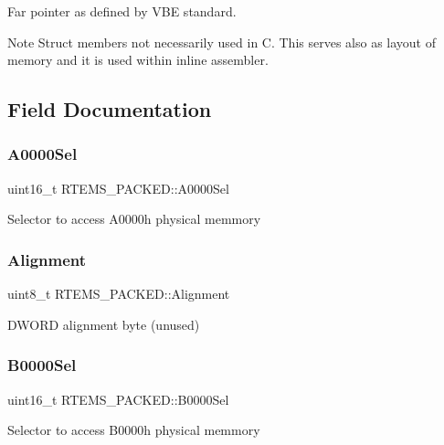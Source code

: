 Far pointer as defined by V\+BE standard.

\begin{DoxyNote}{Note}
Struct members not necessarily used in C. This serves also as layout of memory and it is used within inline assembler. 
\end{DoxyNote}


\subsection{Field Documentation}
\mbox{\label{structRTEMS__PACKED_a79f9bcdc9ed720468301ab6ff09b2763}} 
\subsubsection{\texorpdfstring{A0000Sel}{A0000Sel}}
{\footnotesize\ttfamily uint16\+\_\+t R\+T\+E\+M\+S\+\_\+\+P\+A\+C\+K\+E\+D\+::\+A0000\+Sel}

Selector to access A0000h physical memmory \mbox{\label{structRTEMS__PACKED_afb33a0278bf739dbc7877d71ff87490f}} 
\subsubsection{\texorpdfstring{Alignment}{Alignment}}
{\footnotesize\ttfamily uint8\+\_\+t R\+T\+E\+M\+S\+\_\+\+P\+A\+C\+K\+E\+D\+::\+Alignment}

D\+W\+O\+RD alignment byte (unused) \mbox{\label{structRTEMS__PACKED_af1b07483ed8d8d0e7b16e03e24ccbc3d}} 
\subsubsection{\texorpdfstring{B0000Sel}{B0000Sel}}
{\footnotesize\ttfamily uint16\+\_\+t R\+T\+E\+M\+S\+\_\+\+P\+A\+C\+K\+E\+D\+::\+B0000\+Sel}

Selector to access B0000h physical memmory \mbox{\label{structRTEMS__PACKED_aa2656c2d01a4789f901122dcb8a548c0}} 
